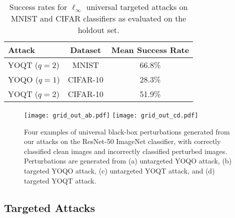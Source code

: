 \documentclass[letterpaper]{article}
\begin{document}
	\begin{table}[t]
		\centering
		\begin{tabular}{lcc}
			\toprule
			Attack & Dataset & Mean Success Rate  \\
			\midrule
			YOQT ($q=2$) & MNIST &  66.8\%  \\
			YOQO ($q=1$) & CIFAR-10 & 28.3\% \\
			YOQT ($q=2$) & CIFAR-10 & 51.9\%  \\
			\bottomrule
		\end{tabular}
		\caption{Success rates for $\ell_\infty$ universal targeted attacks on MNIST and CIFAR classifiers as evaluated on the holdout set.}
		\label{tab:mnist_cifar_targeted}
	\end{table}
	
	
	\begin{figure*}[t]
		\label{fig:untargeted}
		\centering
		\texttt{[image: grid\_out\_ab.pdf]} \hspace{0.5 in} \texttt{[image: grid\_out\_cd.pdf]}
		\caption{Four examples of universal black-box perturbations generated from our attacks on the ResNet-50 ImageNet classifier, with correctly classified clean images and incorrectly classified perturbed images. Perturbations are generated from (a) untargeted YOQO attack, (b) targeted YOQO attack, (c) untargeted YOQT attack, and (d) targeted YOQT attack.}
		
	\end{figure*}
	
	\subsection{Targeted Attacks}
	
	
	
\end{document}
